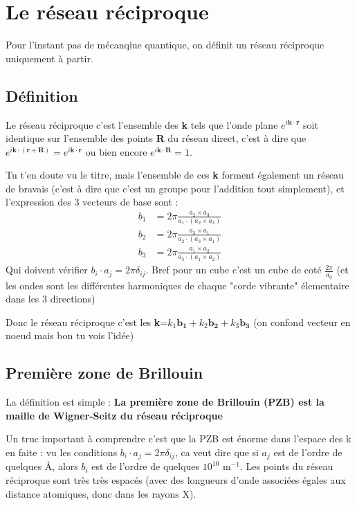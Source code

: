 \documentclass[a4paper]{report}
\begin{document}
  \chapter{Le réseau réciproque}
  Pour l'instant pas de mécanqiue quantique, on définit un réseau réciproque uniquement à partir.
  \section{Définition}
  Le réseau réciproque c'est l'ensemble des \textbf{k} tels que l'onde plane $e^{i\mathbf{k}\cdot\mathbf{r}}$ soit identique sur l'ensemble des points \textbf{R} du réseau direct, c'est à dire que $e^{i\mathbf{k}\cdot\mathbf{(r+R)}}=e^{i\mathbf{k}\cdot\mathbf{r}}$ ou bien encore $e^{i\mathbf{k}\cdot\mathbf{R}}=1$.
  
  Tu t'en doute vu le titre, mais l'ensemble de ces \textbf{k} forment également un réseau de bravais (c'est à dire que c'est un groupe pour l'addition tout simplement), et l'expression des 3 vecteurs de base sont :
  \begin{align*}
  b_1&=2\pi \frac{a_2 \times a_3}{a_1 \cdot (a_2 \times a_3)} \\
  b_2&=2\pi \frac{a_3 \times a_1}{a_2 \cdot (a_3 \times a_1)} \\
  b_3&=2\pi \frac{a_1 \times a_2}{a_3 \cdot (a_1 \times a_2)}
  \end{align*}
  Qui doivent vérifier $b_i \cdot a_j = 2\pi \delta_{ij}$. Bref pour un cube c'est un cube de coté $\frac{2\pi}{a_0}$ (et les ondes sont les différentes harmoniques de chaque "corde vibrante" élementaire dans les 3 directions)
  
  Donc le réseau réciproque c'est les \textbf{k}=$k_1\mathbf{b_1}+k_2\mathbf{b_2}+k_3\mathbf{b_3}$ (on confond vecteur en noeud mais bon tu vois l'idée)
  \section{Première zone de Brillouin}
  La définition est simple : \textbf{La première zone de Brillouin (PZB) est la maille de Wigner-Seitz du réseau réciproque}
  
  Un truc important à comprendre c'est que la PZB est énorme dans l'espace des k en faite : vu les conditions $b_i \cdot a_j = 2\pi \delta_{ij}$, ca veut dire que si $a_j$ est de l'ordre de quelques \AA , alors $b_i$ est de l'ordre de quelques $10^{10}$ m$^{-1}$. Les points du réseau réciproque sont très très espacés (avec des longueurs d'onde associées égales aux distance atomiques, donc dans les rayons X).
  
\end{document}
